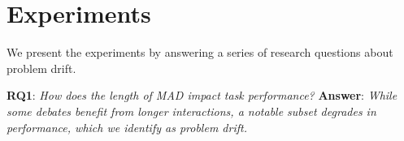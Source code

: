 \section{Experiments}

We present the experiments by answering a series of research questions about problem drift.

\noindent \textbf{RQ1}: \textit{How does the length of MAD impact task performance?} \textbf{Answer}: \textit{While some debates benefit from longer interactions, a notable subset degrades in performance, which we identify as problem drift.}


